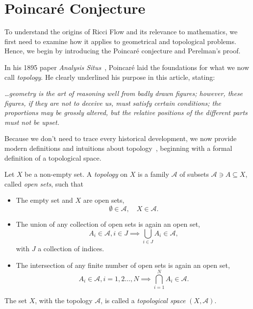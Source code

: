 \section{Poincaré Conjecture}
To understand the origins of Ricci Flow and its relevance to mathematics, we first need to examine how it applies to geometrical and topological problems. Hence, we begin by introducing the Poincaré conjecture and Perelman's proof. 

In his 1895 paper \emph{Analysis Situs}~\cite{poincare:analysis-situs}, Poincaré laid the foundations for what we now call \emph{topology}. He clearly underlined his purpose in this article, stating:

\begin{quoting}
    \noindent \emph{\dots geometry is the art of reasoning well from badly drawn figures; however, these figures, if they are not to deceive us, must satisfy certain conditions; the proportions may be grossly altered, but the relative positions of the different parts must not be upset.}
\end{quoting}

Because we don't need to trace every historical development, we now provide modern definitions and intuitions about topology~\cite{crossley:topology}, beginning with a formal definition of a topological space.

\begin{definition}
    Let $X$ be a non-empty set. A \emph{topology} on $X$ is a family $\mathcal{A}$ of subsets $\mathcal{A} \ni A \subseteq X$, called \emph{open sets}, such that
    \begin{itemize}
        \item The empty set and $X$ are open sets,
        \begin{equation}
            \emptyset \in \mathcal{A}, \quad X     \in \mathcal{A}.
        \end{equation}
        \item The union of any collection of open sets is again an open set,
        \begin{equation}
            A_i \in \mathcal{A}, i \in J \implies \bigcup_{i \in J} A_i \in \mathcal{A},
        \end{equation}
        with $J$ a collection of indices.
        \item The intersection of any finite number of open sets is again an open set,
        \begin{equation}
            A_i \in \mathcal{A}, i = 1, 2 \dots, N \implies \bigcap_{i=1}^N A_i \in \mathcal{A}.
        \end{equation}
    \end{itemize}    

    The set $X$, with the topology $\mathcal{A}$, is called a \emph{topological space} $(X, \mathcal{A})$.
\end{definition}

